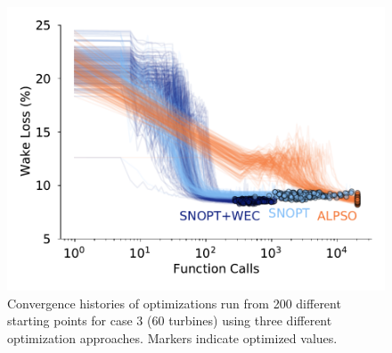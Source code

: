 \documentclass[a4paper]{jpconf}
\begin{document}
%
\begin{figure}[h]
	\centering
	\begin{minipage}[t]{.75\textwidth}
		\centering
		\includegraphics[width=\textwidth]{final_images/results/convergence_history_BPAmodel_60turbs_72dirs}  
		\caption{Convergence histories of optimizations run from 200 different starting points for case 3 (60 turbines) using three different optimization approaches. Markers indicate optimized values.}
		\label{fig:case-3-histories}
	\end{minipage} 
\end{figure}
%
\end{document}
